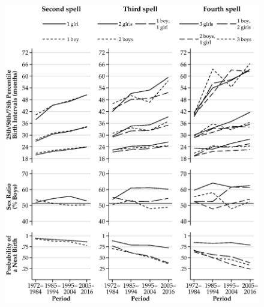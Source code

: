 \documentclass[12pt,letterpaper]{article}
\begin{document}
\begin{figure}
\centering
\includegraphics[width=\textwidth,height=\textheight,keepaspectratio=true]{bs_high_urban}
\end{figure}
\end{document}
